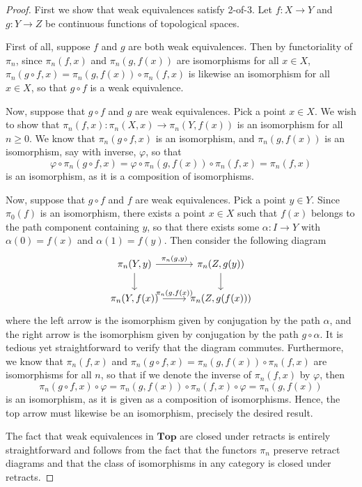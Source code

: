 \documentclass{amsart}
\theoremstyle{plain}
\theoremstyle{definition}
\newcommand{\Top}{\mbf{Top}}
\newcommand{\0}{\mathbf{0}}
\newcommand{\mbf}[1]{\mathbf{#1}}
\renewcommand{\(}{\left(}
\renewcommand{\)}{\right)}
\begin{document}
\begin{proof}
  First we show that weak equivalences satisfy 2-of-3. Let $f:X\to Y$ and $g:Y\to Z$ be continuous functions of topological spaces. 
  
  First of all, suppose $f$ and $g$ are both weak equivalences. Then by functoriality of $\pi_n$, since $\pi_n(f,x)$ and $\pi_n(g,f(x))$ are isomorphisms for all $x\in X$, $\pi_n(g\circ f,x)=\pi_n(g,f(x))\circ\pi_n(f,x)$ is likewise an isomorphism for all $x\in X$, so that $g\circ f$ is a weak equivalence.

  Now, suppose that $g\circ f$ and $g$ are weak equivalences. Pick a point $x\in X$. We wish to show that $\pi_n(f,x):\pi_n(X,x)\to\pi_n(Y,f(x))$ is an isomorphism for all $n\geq0$. We know that $\pi_n(g\circ f,x)$ is an isomorphism, and $\pi_n(g,f(x))$ is an isomorphism, say with inverse, $\varphi$, so that
  \[\varphi\circ\pi_n(g\circ f,x)=\varphi\circ\pi_n(g,f(x))\circ\pi_n(f,x)=\pi_n(f,x)\]
  is an isomorphism, as it is a composition of isomorphisms.

  Now, suppose that $g\circ f$ and $f$ are weak equivalences. Pick a point $y\in Y$. Since $\pi_0(f)$ is an isomorphism, there exists a point $x\in X$ such that $f(x)$ belongs to the path component containing $y$, so that there exists some $\alpha:I\to Y$ with $\alpha(0)=f(x)$ and $\alpha(1)=f(y)$. Then consider the following diagram
  \[\begin{tikzcd}
    {\pi_n(Y,y)} & {\pi_n(Z,g(y))} \\
    {\pi_n(Y,f(x))} & {\pi_n(Z,g(f(x)))}
    \arrow["{\pi_n(g,y)}", from=1-1, to=1-2]
    \arrow[from=1-1, to=2-1]
    \arrow["{\pi_n(g,f(x))}", from=2-1, to=2-2]
    \arrow[from=1-2, to=2-2]
  \end{tikzcd}\]
  where the left arrow is the isomorphism given by conjugation by the path $\alpha$, and the right arrow is the isomorphism given by conjugation by the path $g\circ\alpha$. It is tedious yet straightforward to verify that the diagram commutes.
  Furthermore, we know that $\pi_n(f,x)$ and $\pi_n(g\circ f,x)=\pi_n(g,f(x))\circ\pi_n(f,x)$ are isomorphisms for all $n$, so that if we denote the inverse of $\pi_n(f,x)$ by $\varphi$, then
  \[\pi_n(g\circ f,x)\circ\varphi=\pi_n(g,f(x))\circ\pi_n(f,x)\circ\varphi=\pi_n(g,f(x))\]
  is an isomorphism, as it is given as a composition of isomorphisms. Hence, the top arrow must likewise be an isomorphism, precisely the desired result.

  The fact that weak equivalences in $\Top$ are closed under retracts is entirely straightforward and follows from the fact that the functors $\pi_n$ preserve retract diagrams and that the class of isomorphisms in any category is closed under retracts.
\end{proof}
\end{document}
